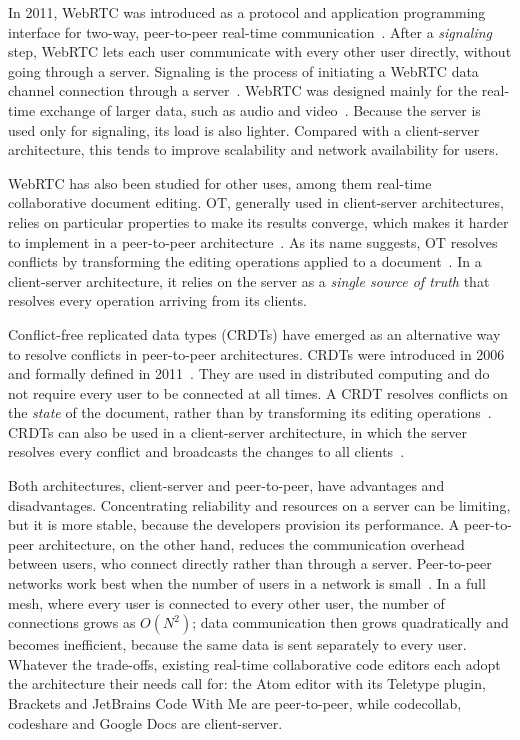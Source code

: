 In 2011, WebRTC was introduced as a protocol and application programming interface for two-way, peer-to-peer real-time communication~\citep{dutton2012getting}. After a \emph{signaling} step, WebRTC lets each user communicate with every other user directly, without going through a server. Signaling is the process of initiating a WebRTC data channel connection through a server~\citep{sredojev2015webrtc}. WebRTC was designed mainly for the real-time exchange of larger data, such as audio and video~\citep{dutton2012getting}. Because the server is used only for signaling, its load is also lighter. Compared with a client-server architecture, this tends to improve scalability and network availability for users.

WebRTC has also been studied for other uses, among them real-time collaborative document editing. OT, generally used in client-server architectures, relies on particular properties to make its results converge, which makes it harder to implement in a peer-to-peer architecture~\citep{Sun2017}. As its name suggests, OT resolves conflicts by transforming the editing operations applied to a document~\citep{OTOverview1}. In a client-server architecture, it relies on the server as a \emph{single source of truth} that resolves every operation arriving from its clients.

Conflict-free replicated data types (CRDTs) have emerged as an alternative way to resolve conflicts in peer-to-peer architectures. CRDTs were introduced in 2006 and formally defined in 2011~\citep{Shapiro2011}. They are used in distributed computing and do not require every user to be connected at all times. A CRDT resolves conflicts on the \emph{state} of the document, rather than by transforming its editing operations~\citep{CRDToverview1}. CRDTs can also be used in a client-server architecture, in which the server resolves every conflict and broadcasts the changes to all clients~\citep{Sun2019First}.

Both architectures, client-server and peer-to-peer, have advantages and disadvantages. Concentrating reliability and resources on a server can be limiting, but it is more stable, because the developers provision its performance. A peer-to-peer architecture, on the other hand, reduces the communication overhead between users, who connect directly rather than through a server. Peer-to-peer networks work best when the number of users in a network is small~\citep{leibnitz2007peer, maly2003comparison}. In a full mesh, where every user is connected to every other user, the number of connections grows as $O(N^2)$; data communication then grows quadratically and becomes inefficient, because the same data is sent separately to every user. Whatever the trade-offs, existing real-time collaborative code editors each adopt the architecture their needs call for: the Atom editor with its Teletype plugin, Brackets and JetBrains Code With Me are peer-to-peer, while codecollab, codeshare and Google Docs are client-server.

